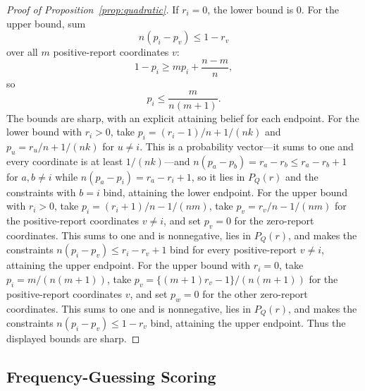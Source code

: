 \begin{proof}[Proof of Proposition~\ref{prop:quadratic}]
If \(r_i=0\), the lower bound is \(0\).
For the upper bound, sum
\[
n(p_i-p_v)\le 1-r_v
\]
over all \(m\) positive-report coordinates \(v\):
\[
1-p_i\ge mp_i+\frac{n-m}{n},
\]
so
\[
p_i\le \frac{m}{n(m+1)}.
\]
The bounds are sharp, with an explicit attaining belief for each endpoint.
For the lower bound with \(r_i>0\), take \(p_i=(r_i-1)/n+1/(nk)\) and \(p_u=r_u/n+1/(nk)\) for \(u\ne i\).
This is a probability vector---it sums to one and every coordinate is at least \(1/(nk)\)---and \(n(p_a-p_b)=r_a-r_b\le r_a-r_b+1\) for \(a,b\ne i\) while \(n(p_a-p_i)=r_a-r_i+1\), so it lies in \(P_Q(r)\) and the constraints with \(b=i\) bind, attaining the lower endpoint.
For the upper bound with \(r_i>0\), take \(p_i=(r_i+1)/n-1/(nm)\), take \(p_v=r_v/n-1/(nm)\) for the positive-report coordinates \(v\ne i\), and set \(p_v=0\) for the zero-report coordinates.
This sums to one and is nonnegative, lies in \(P_Q(r)\), and makes the constraints \(n(p_i-p_v)\le r_i-r_v+1\) bind for every positive-report \(v\ne i\), attaining the upper endpoint.
For the upper bound with \(r_i=0\), take \(p_i=m/(n(m+1))\), take \(p_v=\{(m+1)r_v-1\}/(n(m+1))\) for the positive-report coordinates \(v\), and set \(p_w=0\) for the other zero-report coordinates.
This sums to one and is nonnegative, lies in \(P_Q(r)\), and makes the constraints \(n(p_i-p_v)\le 1-r_v\) bind, attaining the upper endpoint.
Thus the displayed bounds are sharp.
\end{proof}

\subsection{Frequency-Guessing Scoring}
\label{app:exact-match-proof}

